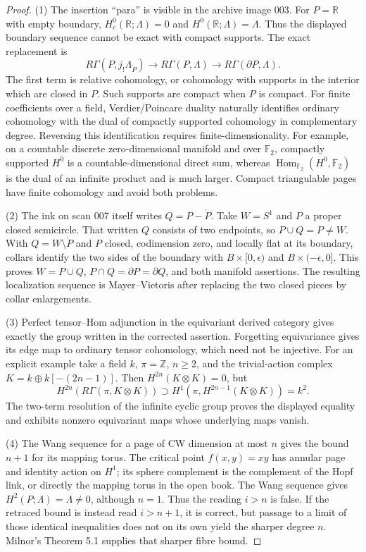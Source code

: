 \begin{proof}
(1) The insertion ``para'' is visible in the archive image 003.
For $P=\mathbb R$ with empty boundary,
$H_c^0(\mathbb R;\Lambda)=0$ and $H^0(\mathbb R;\Lambda)=\Lambda$.
Thus the displayed boundary sequence cannot be exact with compact
supports. The exact replacement is
\[
 R\Gamma(P,j_!\Lambda_{\mathring P})\longrightarrow
 R\Gamma(P,\Lambda)\longrightarrow R\Gamma(\partial P,\Lambda).
\]
The first term is relative cohomology, or cohomology with supports in
the interior which are closed in $P$. Such supports are compact when
$P$ is compact. For finite coefficients over a field, Verdier/Poincare
duality naturally identifies ordinary cohomology with the dual of
compactly supported cohomology in complementary degree. Reversing
this identification requires finite-dimensionality. For example,
on a countable discrete zero-dimensional manifold and over
$\mathbb F_2$, compactly supported $H^0$ is a countable-dimensional
direct sum, whereas $\operatorname{Hom}_{\mathbb F_2}
(H^0,\mathbb F_2)$ is the dual of an infinite product and is much
larger. Compact triangulable pages have finite cohomology and avoid
both problems.

(2) The ink on scan 007 itself writes $Q=P-\mathring P$.
Take $W=S^1$ and $P$ a proper closed semicircle. That written $Q$
consists of two endpoints, so $P\cup Q=P\ne W$.
With $Q=W\setminus\mathring P$ and $P$ closed, codimension zero,
and locally flat at its boundary, collars identify the two sides of
the boundary with $B\times[0,\epsilon)$ and
$B\times(-\epsilon,0]$. This proves
$W=P\cup Q$, $P\cap Q=\partial P=\partial Q$, and both manifold
assertions. The resulting localization sequence is Mayer--Vietoris
after replacing the two closed pieces by collar enlargements.

(3) Perfect tensor--Hom adjunction in the equivariant derived category
gives exactly the group written in the corrected assertion. Forgetting
equivariance gives its edge map to ordinary tensor cohomology, which
need not be injective. For an explicit example take a field $k$,
$\pi=\mathbb Z$, $n\geq2$, and the trivial-action complex
$K=k\oplus k[-(2n-1)]$. Then
$H^{2n}(K\otimes K)=0$, but
\[
 H^{2n}(R\Gamma(\pi,K\otimes K))
 \supset H^1(\pi,H^{2n-1}(K\otimes K))=k^2.
\]
The two-term resolution of the infinite cyclic group proves the
displayed equality and exhibits nonzero equivariant maps whose
underlying maps vanish.

(4) The Wang sequence for a page of CW dimension at most $n$
gives the bound $n+1$ for its mapping torus. The critical point
$f(x,y)=xy$ has annular page and identity action on $H^1$;
its sphere complement is the complement of the Hopf link, or directly
the mapping torus in the open book. The Wang sequence gives
$H^2(P;\Lambda)=\Lambda\ne0$, although $n=1$.
Thus the reading $i>n$ is false. If the retraced bound is instead
read $i>n+1$, it is correct, but passage to a limit of those identical
inequalities does not on its own yield the sharper degree $n$.
Milnor's Theorem 5.1 supplies that sharper fibre bound.


\end{proof}
